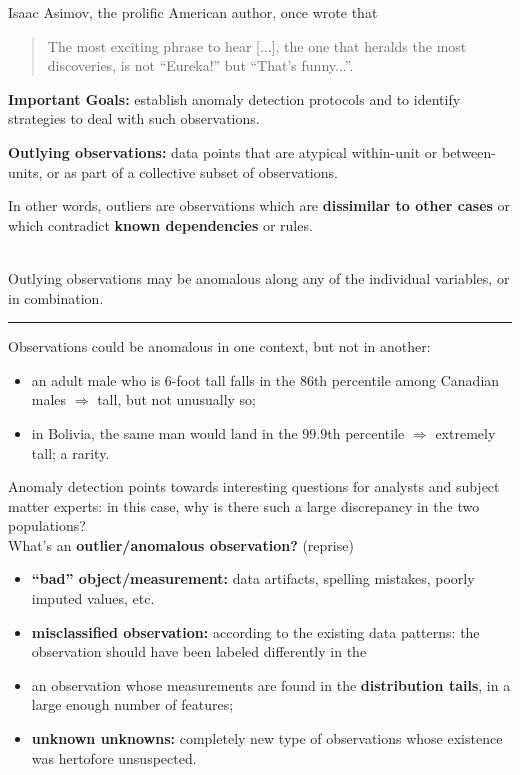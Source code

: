 \documentclass[20pt,landscape,footrule,headrule]{foils}
\def\fh{\foilhead}
\begin{document}
\fh{\textcolor{darkestgreen}{5.1 -- Basic Notions and Overview}} \label{5.1}
\noindent Isaac Asimov, the prolific American author, once wrote that \begin{quote} The most exciting phrase to hear [...], the one that heralds the most discoveries, is not ``Eureka!'' but ``That's funny...''.\end{quote}

\noindent \textbf{Important Goals:} establish anomaly detection protocols  and to identify strategies to deal with such observations.

\noindent \textbf{Outlying observations:} data points that are atypical within-unit or between-units, or as part of a collective subset of observations. 

\noindent In other words, outliers are observations which are \textbf{dissimilar to other cases} or which contradict \textbf{known dependencies} or rules.

\newpage\ \\ \noindent Outlying observations may be anomalous along any of the individual variables, or in combination.
\begin{center}
    \rule{0.5\textwidth}{.4pt}
\end{center}
\noindent Observations could be anomalous in one context, but not in another: 
\begin{itemize}
\item an adult male who is 6-foot tall falls in the $86$th percentile among Canadian males $\Longrightarrow$ tall, but not unusually so; 
\item in Bolivia, the same man would land in the $99.9$th percentile $\Longrightarrow$ extremely tall; a rarity.
\end{itemize}
Anomaly detection points towards interesting questions for analysts and subject matter experts: in this case, why is there such a large discrepancy in the two populations?  
\newpage \ \\ \noindent
What's an \textbf{outlier/anomalous observation?} (reprise)
\begin{itemize}
\item \textbf{``bad'' object/measurement:} data artifacts, spelling mistakes, poorly imputed values, etc.
\item  \textbf{misclassified observation:} according to the existing data patterns: the observation should have been labeled differently in the 
\item  an observation whose measurements are found in the \textbf{distribution tails}, in a large enough number of features;
\item \textbf{unknown unknowns:} completely new type of observations whose existence was hertofore unsuspected.
\end{itemize}
\end{document}
